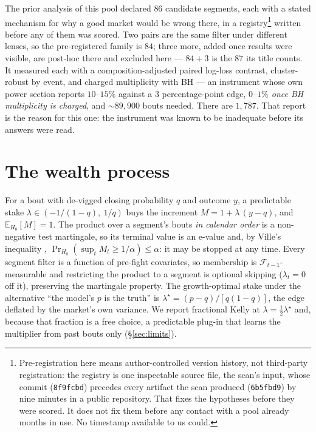 \documentclass{article}
\begin{document}
The prior analysis of this pool \citep{vertexlab} declared $86$ candidate segments, each with a stated mechanism for why a good market would be wrong there, in a registry\footnote{Pre-registration here means author-controlled version history, not third-party registration: the registry is one inspectable source file, the scan's input, whose commit (\texttt{8f9fcbd}) precedes every artifact the scan produced (\texttt{6b5fbd9}) by nine minutes in a public repository. That fixes the hypotheses before they were scored. It does not fix them before any contact with a pool already months in use. No timestamp available to us could.} written before any of them was scored. Two pairs are the same filter under different lenses, so the pre-registered family is $84$; three more, added once results were visible, are post-hoc there and excluded here --- $84+3$ is the $87$ its title counts. It measured each with a composition-adjusted paired log-loss contrast, cluster-robust by event, and charged multiplicity with BH --- an instrument whose own power section reports $10$--$15\%$ against a $3$ percentage-point edge, \emph{$0$--$1\%$ once BH multiplicity is charged}, and ${\sim}89{,}900$ bouts needed. There are $1{,}787$. That report is the reason for this one: the instrument was known to be inadequate before its answers were read.

\section{The wealth process}

For a bout with de-vigged closing probability $q$ and outcome $y$, a predictable stake $\lambda \in (-1/(1-q),\ 1/q)$ buys the increment $M = 1 + \lambda\,(y-q)$, and $\mathbb{E}_{H_0}[M] = 1$. The product over a segment's bouts \emph{in calendar order} is a non-negative test martingale, so its terminal value is an e-value and, by Ville's inequality \citep{ville1939}, $\Pr_{H_0}(\sup_t M_t \ge 1/\alpha)\le\alpha$: it may be stopped at any time. Every segment filter is a function of pre-fight covariates, so membership is $\mathcal{F}_{t-1}$-measurable and restricting the product to a segment is optional skipping ($\lambda_t=0$ off it), preserving the martingale property. The growth-optimal stake under the alternative ``the model's $p$ is the truth'' is $\lambda^\star = (p-q)/[q(1-q)]$, the edge deflated by the market's own variance. We report fractional Kelly at $\lambda=\tfrac12\lambda^\star$ and, because that fraction is a free choice, a predictable plug-in \citep{wsr2024} that learns the multiplier from past bouts only (\S\ref{sec:limits}).
\end{document}
